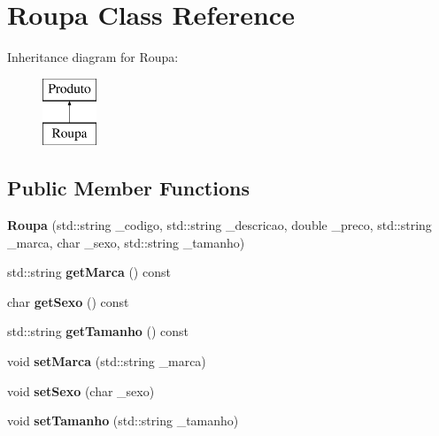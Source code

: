 \hypertarget{classRoupa}{}\section{Roupa Class Reference}
\label{classRoupa}
Inheritance diagram for Roupa\+:\begin{figure}[H]
\begin{center}
\leavevmode
\includegraphics[height=2.000000cm]{classRoupa}
\end{center}
\end{figure}
\subsection*{Public Member Functions}
\begin{DoxyCompactItemize}
\item 
\mbox{\label{classRoupa_a6deaef1b59d73712322ef805a7585140}} 
{\bfseries Roupa} (std\+::string \+\_\+codigo, std\+::string \+\_\+descricao, double \+\_\+preco, std\+::string \+\_\+marca, char \+\_\+sexo, std\+::string \+\_\+tamanho)
\item 
\mbox{\label{classRoupa_a2bf426a4019f698230095573a0bf089c}} 
std\+::string {\bfseries get\+Marca} () const
\item 
\mbox{\label{classRoupa_a4881596b2683965fe9c689c71383b1c2}} 
char {\bfseries get\+Sexo} () const
\item 
\mbox{\label{classRoupa_af49bdcfcefc426815a89f77b4f2083a6}} 
std\+::string {\bfseries get\+Tamanho} () const
\item 
\mbox{\label{classRoupa_a779827a9b55aa33229413fa441f45ab7}} 
void {\bfseries set\+Marca} (std\+::string \+\_\+marca)
\item 
\mbox{\label{classRoupa_a40e8636ee6b49b145924b155dbd57690}} 
void {\bfseries set\+Sexo} (char \+\_\+sexo)
\item 
\mbox{\label{classRoupa_ab5541947bc4fde1925422eab8cc6b190}} 
void {\bfseries set\+Tamanho} (std\+::string \+\_\+tamanho)
\end{DoxyCompactItemize}
